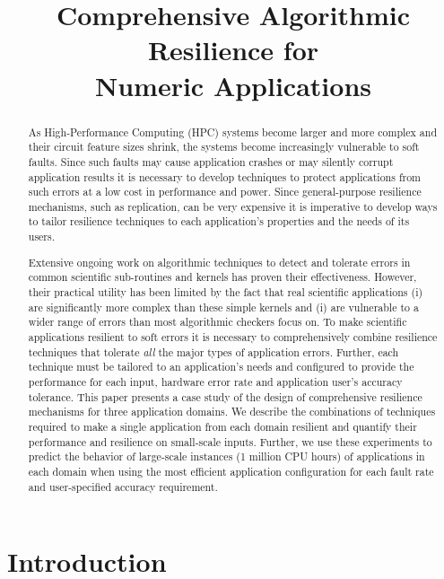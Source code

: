 \documentclass[10pt, conference, compsocconf]{IEEEtran}
\title{Comprehensive Algorithmic Resilience for \\Numeric Applications}
\author{\IEEEauthorblockN{Sui Chen}
\IEEEauthorblockA{Louisiana State \\ University}
\and
\IEEEauthorblockN{Greg Bronevetsky}
\IEEEauthorblockA{Lawrence Livermore \\ National Laboratory}
\and
\IEEEauthorblockN{Marc Casas-Guix}
\IEEEauthorblockA{Barcelona Supercomputing \\ Center}
\and
\IEEEauthorblockN{Lu Peng}
\IEEEauthorblockA{Louisiana State \\ University}
}
\begin{document}
\maketitle
\begin{abstract}

As High-Performance Computing (HPC) systems become larger and more complex and their circuit feature sizes shrink, the systems become increasingly vulnerable to soft faults.
Since such faults may cause application crashes or may silently corrupt application results it is necessary to develop techniques to protect applications from such errors at a low cost in performance and power.
Since general-purpose resilience mechanisms, such as replication, can be very expensive it is imperative to develop ways to tailor resilience techniques to each application's properties and the needs of its users.

Extensive ongoing work on algorithmic techniques to detect and tolerate errors in common scientific sub-routines and kernels has proven their effectiveness.
However, their practical utility has been limited by the fact that real scientific applications (i) are significantly more complex than these simple kernels and (i) are vulnerable to a wider range of errors than most algorithmic checkers focus on.
To make scientific applications resilient to soft errors it is necessary to comprehensively combine resilience techniques that tolerate \emph{all} the major types of application errors.
Further, each technique must be tailored to an application's needs and configured to provide the performance for each input, hardware error rate and application user's accuracy tolerance.
This paper presents a case study of the design of comprehensive resilience mechanisms for three application domains.
We describe the combinations of techniques required to make a single application from each domain resilient and quantify their performance and resilience on small-scale inputs.
Further, we use these experiments to predict the behavior of large-scale instances (1 million CPU hours) of applications in each domain when using the most efficient application configuration for each fault rate and user-specified accuracy requirement.

\end{abstract}

\vspace{-10pt}
\section{Introduction}
\vspace{-10pt}
\label{sec:intro}
\end{document}
